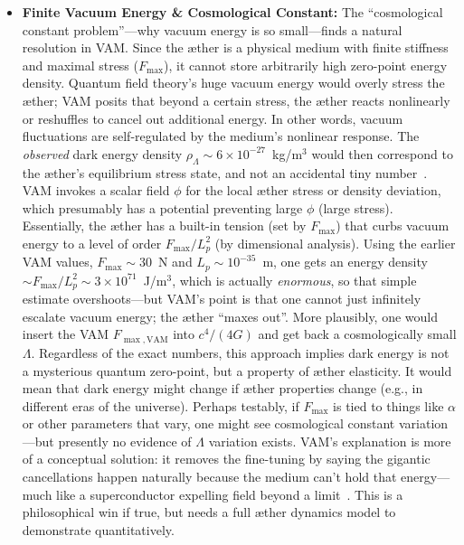 \documentclass[a4paper,12pt]{article}
\begin{document}
\begin{itemize}
\item 
\textbf{Finite Vacuum Energy \& Cosmological Constant:} The “cosmological constant problem”---why vacuum energy is so small---finds a natural resolution in VAM. Since the æther is a physical medium with finite stiffness and maximal stress ($F_{\max}$), it cannot store arbitrarily high zero-point energy density. Quantum field theory’s huge vacuum energy would overly stress the æther; VAM posits that beyond a certain stress, the æther reacts nonlinearly or reshuffles to cancel out additional energy. In other words, vacuum fluctuations are self-regulated by the medium’s nonlinear response. The \textit{observed} dark energy density $\rho_\Lambda \sim 6\times10^{-27}$~kg/m$^3$ would then correspond to the æther’s equilibrium stress state, and not an accidental tiny number~\cite{weinberg1989cosmological}. VAM invokes a scalar field $\phi$ for the local æther stress or density deviation, which presumably has a potential preventing large $\phi$ (large stress). Essentially, the æther has a built-in tension (set by $F_{\max}$) that curbs vacuum energy to a level of order $F_{\max}/L_p^2$ (by dimensional analysis). Using the earlier VAM values, $F_{\max}\sim 30$~N and $L_p\sim10^{-35}$~m, one gets an energy density $\sim F_{\max}/L_p^2 \sim 3\times10^{71}$~J/m$^3$, which is actually \textit{enormous}, so that simple estimate overshoots---but VAM’s point is that one cannot just infinitely escalate vacuum energy; the æther “maxes out”. More plausibly, one would insert the VAM $F_{\max,\text{VAM}}$ into $c^4/(4G)$ and get back a cosmologically small $\Lambda$. Regardless of the exact numbers, this approach implies dark energy is not a mysterious quantum zero-point, but a property of æther elasticity. It would mean that dark energy might change if æther properties change (e.g., in different eras of the universe). Perhaps testably, if $F_{\max}$ is tied to things like $\alpha$ or other parameters that vary, one might see cosmological constant variation---but presently no evidence of $\Lambda$ variation exists. VAM’s explanation is more of a conceptual solution: it removes the fine-tuning by saying the gigantic cancellations happen naturally because the medium can’t hold that energy---much like a superconductor expelling field beyond a limit~\cite{padmanabhan2003cosmological}. This is a philosophical win if true, but needs a full æther dynamics model to demonstrate quantitatively.


\end{itemize}
\end{document}
